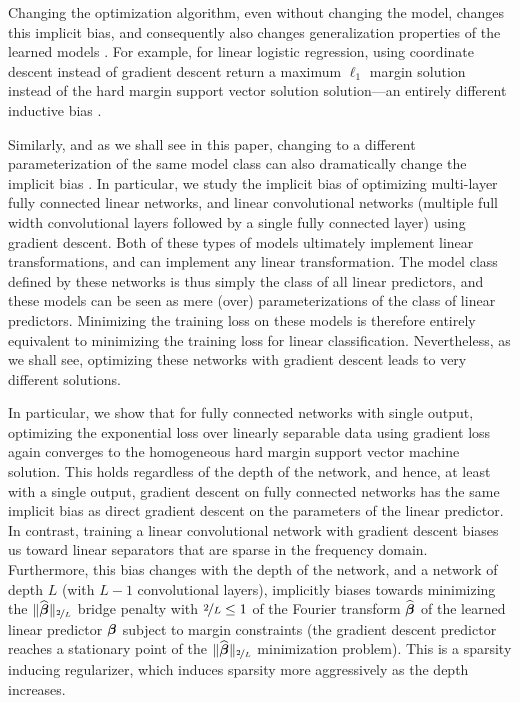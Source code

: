 \documentclass{article}
\renewcommand{\hat}{\widehat}
\newcommand{\w}[1][]{\ifthenelse{\equal{#1}{}}{\boldsymbol{\beta}}{\boldsymbol{\beta}^{(#1)}}}
\begin{document}
Changing the optimization algorithm, even without changing the model, changes this implicit bias, and consequently also changes generalization properties of the learned models \citep{neyshabur2015path,keskar2016large,wilson2017marginal,gunasekar2017implicit,gunasekar2018characterizing}. For example, for linear logistic regression,  using coordinate descent instead of gradient descent return a maximum $\ell_1$ margin solution instead of the hard margin support vector solution solution---an entirely different inductive bias \cite{telgarsky2013margins,gunasekar2018characterizing}. 

Similarly, and as we shall see in this paper, changing to a different parameterization of the same model class can also dramatically change the implicit bias \cite{gunasekar2017implicit}.  In particular,  we study the implicit bias of optimizing multi-layer   fully connected linear networks, and linear convolutional networks (multiple full width convolutional layers followed by a single fully connected layer) using gradient descent. 
Both of these types of models ultimately implement linear transformations, and can implement any linear transformation.  The model class defined by these networks is thus simply the class of all linear predictors, and these models can be seen as mere (over) parameterizations of the class of linear predictors.  Minimizing the training loss on these models is therefore entirely equivalent to minimizing the training loss for linear classification.  Nevertheless, as we shall see, optimizing these networks with gradient descent leads to very different solutions. 

In particular, we show that for fully connected networks with single output, optimizing the exponential loss over linearly separable data using gradient loss  again converges to the homogeneous hard margin support vector machine solution. This holds regardless of the depth of the  network, and hence, at least with a single output, gradient descent on fully connected networks has the same implicit bias as direct gradient descent on the parameters of the linear predictor.  In contrast, training a linear convolutional network with gradient descent biases us toward linear separators that are sparse in the frequency domain.  Furthermore, this bias changes with the depth of the network, and a network of depth $L$ (with $L-1$ convolutional layers), implicitly biases towards  minimizing the $\|{\hat{\w}}\|_{\nicefrac{2}{L}}$  bridge penalty with $\nicefrac{2}{L}\le 1$ of the Fourier transform $\hat{\w}$ of the learned linear predictor $\w$ subject to margin constraints (the gradient descent predictor reaches a stationary point of the $\|{\hat{\w}}\|_{\nicefrac{2}{L}}$ minimization problem).  This is a sparsity inducing regularizer, which induces sparsity more aggressively as  the depth increases.
\end{document}
